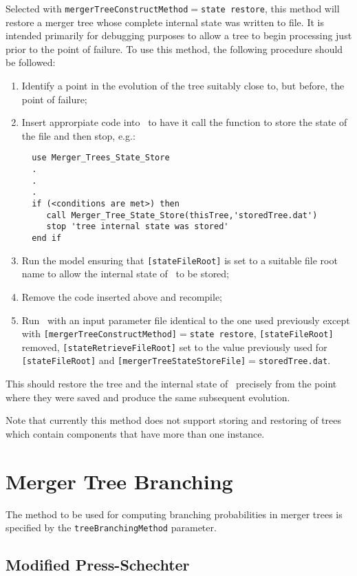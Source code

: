 Selected with {\tt mergerTreeConstructMethod}$=${\tt state restore}, this method will restore a merger tree whose complete internal state was written to file. It is intended primarily for debugging purposes to allow a tree to begin processing just prior to the point of failure. To use this method, the following procedure should be followed:
\begin{enumerate}
 \item Identify a point in the evolution of the tree suitably close to, but before, the point of failure;
 \item Insert approrpiate code into \glc\ to have it call the function to store the state of the file and then stop, e.g.:
 \begin{verbatim}
  use Merger_Trees_State_Store
  .
  .
  .
  if (<conditions are met>) then
     call Merger_Tree_State_Store(thisTree,'storedTree.dat')
     stop 'tree internal state was stored'
  end if
 \end{verbatim}
 \item Run the model ensuring that {\tt [stateFileRoot]} is set to a suitable file root name to allow the internal state of \glc\ to be stored;
 \item Remove the code inserted above and recompile;
 \item Run \glc\ with an input parameter file identical to the one used previously except with {\tt [mergerTreeConstructMethod]}$=${\tt state restore}, {\tt [stateFileRoot]} removed, {\tt [stateRetrieveFileRoot]} set to the value previously used for {\tt [stateFileRoot]} and {\tt [mergerTreeStateStoreFile]}$=${\tt storedTree.dat}.
\end{enumerate}
This should restore the tree and the internal state of \glc\ precisely from the point where they were saved and produce the same subsequent evolution.

Note that currently this method does not support storing and restoring of trees which contain components that have more than one instance.

\section{Merger Tree Branching}

The method to be used for computing branching probabilities in merger trees is specified by the {\tt treeBranchingMethod} parameter.

\subsection{Modified Press-Schechter}

